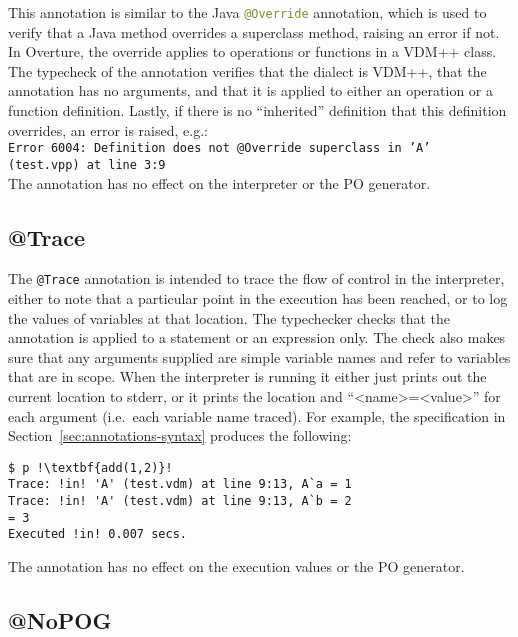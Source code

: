 This annotation is similar to the Java
\lstinline[language=Java]|@Override| annotation, which is used to
verify that a Java method overrides a superclass method, raising an
error if not. In Overture, the override applies to operations or
functions in a VDM++ class. The typecheck of the annotation verifies
that the dialect is VDM++, that the annotation has no arguments, and
that it is applied to either an operation or a function
definition. Lastly, if there is no ``inherited'' definition that this
definition overrides, an error is
raised, e.g.:\\

\noindent \texttt{Error 6004: Definition does not @Override superclass
  in 'A'\\ (test.vpp) at line 3:9}\\

\noindent The annotation has no effect on the interpreter or the PO
generator.

\subsection{@Trace}

The \lstinline[language=VDM++]|@Trace| annotation is intended to trace
the flow of control in the interpreter, either to note that a
particular point in the execution has been reached, or to log the
values of variables at that location. The typechecker checks that the
annotation is applied to a statement or an expression only. The check
also makes sure that any arguments supplied are simple variable names
and refer to variables that are in scope. When the interpreter is
running it either just prints out the current location to stderr, or
it prints the location and
``\textless{}name{}\textgreater{}={}\textless{}value{}\textgreater''
for each argument (i.e.\ each variable name traced). For example, the
specification in Section~\ref{sec:annotations-syntax} produces the
following:

\begin{lstlisting}[style=tool,escapechar=!]
$ p !\textbf{add(1,2)}!
Trace: !in! 'A' (test.vdm) at line 9:13, A`a = 1
Trace: !in! 'A' (test.vdm) at line 9:13, A`b = 2
= 3
Executed !in! 0.007 secs.
\end{lstlisting}

\noindent The annotation has no effect on the execution values or the
PO generator.

\subsection{@NoPOG}

